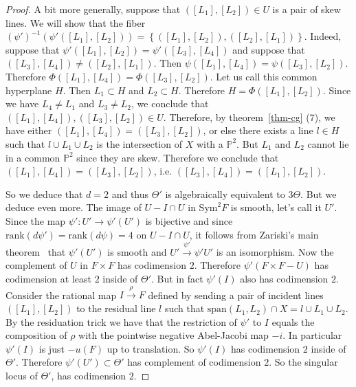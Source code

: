 \documentclass[amssymb,twoside,12 pt,amscd,reqno]{amsart}
\theoremstyle{plain}
\theoremstyle{definition}
\newcommand{\PP}{\mathbb{P}}
\def\ps{\vspace{4pt}}
\newcommand{\lt}{\left}
\newcommand{\rt}{\right}
\begin{document}
\begin{proof}
\ps

A bit more generally, suppose that $\lt([L_1],[L_2]\rt)\in U$ is a pair
of skew lines.  We will show
that the fiber $\lt(\psi'\rt)^{-1}\lt(\psi'\lt([L_1],[L_2]\rt)\rt) = \lt\{
\lt([L_1],[L_2]\rt),\lt([L_2],[L_1]\rt)\rt\}$.  Indeed, suppose that 
$\psi'\lt([L_1],[L_2]\rt) =\psi'\lt([L_3],[L_4]\rt)$ and suppose
that $\lt([L_3],[L_4]\rt)\neq \lt([L_2],[L_1]\rt)$.  Then
$\psi\lt( [L_1],[L_4]\rt)=\psi\lt([L_3],[L_2]\rt)$.  Therefore
$\Phi\lt([L_1],[L_4]\rt)=\Phi\lt([L_3],[L_2]\rt)$.  Let us call this
common hyperplane $H$.  Then $L_1\subset H$ and $L_2\subset H$.  Therefore
$H=\Phi\lt([L_1],[L_2]\rt)$.  Since we have $L_4\neq L_1$ and $L_3\neq L_2$,
we conclude that $ \lt([L_1],[L_4]\rt), \lt([L_3],[L_2]\rt)\in U$.
Therefore, by theorem~\ref{thm-cg} (7), we have either $\lt([L_1],[L_4]\rt)=
 \lt([L_3],[L_2]\rt)$, or else there exists a line $l\in H$ such that
$l\cup L_1\cup L_2$ is the intersection of $X$ with a $\PP^2$.  But $L_1$
and $L_2$ cannot lie in a common $\PP^2$ since they are skew.  Therefore
we conclude that $\lt([L_1],[L_4]\rt)=
 \lt([L_3],[L_2]\rt)$, i.e. $\lt([L_3],[L_4]\rt)=\lt([L_1],[L_2]\rt)$.

\ps

So we deduce that $d=2$ and thus $\Theta'$ is algebraically equivalent 
to $3\Theta$.  But we deduce even more.  The image of 
$U-I\cap U$ in $\text{Sym}^2 F$ is smooth, let's call it $U'$.  Since
the map $\psi':U'\rightarrow\psi'(U')$ is bijective and since
$\text{rank}(d\psi') = \text{rank}(d\psi) = 4$ on $U - I\cap U$, 
it follows from Zariski's main
theorem~\cite[p. 288-289]{M} that 
$\psi'(U')$ is 
smooth and $U'\xrightarrow{\psi'}\psi'{U'}$ is an isomorphism.  Now the
complement of $U$ in $F\times F$ has codimension $2$.  Therefore
$\psi'(F\times F-U)$ has codimension at least $2$ inside of $\Theta'$.
But in fact $\psi'(I)$ also has codimension $2$.  Consider the rational
map $I\xrightarrow{\rho} F$ defined by sending a pair of incident lines
$\lt([L_1],[L_2]\rt)$ to the residual line $l$ such that
$\text{span}(L_1,L_2)\cap X = l\cup L_1\cup L_2$.  By the residuation trick
we have that the restriction of $\psi'$ to $I$ equals the composition 
of $\rho$ with the pointwise negative Abel-Jacobi map $-i$.  In
particular $\psi'(I)$ is just $-u(F)$ up to translation.  So $\psi'(I)$ has
codimension $2$ inside of $\Theta'$.  Therefore $\psi'(U')\subset\Theta'$
has complement of codimension $2$.  So the singular locus
of  $\Theta'$, has codimension $2$.

\ps



\end{proof}
\end{document}
